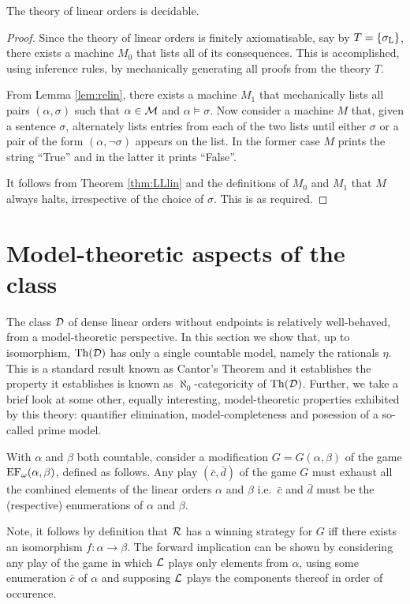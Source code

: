 \begin{thm} The theory of linear orders is decidable.
\end{thm}
\begin{proof} Since the theory of linear orders is finitely axiomatisable, say
	by $T=\left\lbrace \sigma_{\mathrm{L}}\right\rbrace$, there exists a machine $M_0$ that lists all of its
	consequences.  This is accomplished, using inference rules, by mechanically
	generating all proofs from the theory $T$.

	From Lemma \ref{lem:relin}, there exists a machine $M_1$ that mechanically
	lists all pairs $(\alpha,\sigma)$ such that $\alpha\in\mathcal{M}$ and
	$\alpha\models\sigma$.  Now consider a machine $M$ that, given a sentence
	$\sigma$, alternately lists entries from each of the two lists until either
	$\sigma$ or a pair of the form $(\alpha,\neg\sigma)$ appears on the list.  In
	the former case $M$ prints the string ``True'' and in the latter it prints
	``False''.

	It follows from Theorem \ref{thm:LLlin} and the definitions of $M_0$ and
	$M_1$ that $M$ always halts, irrespective of the choice of $\sigma$.  This is as
	required.
\end{proof}


\section{Model-theoretic aspects of the class \text{$\dense$}}

The class $\dense$ of dense linear orders without endpoints is relatively
well-behaved, from a model-theoretic perspective.  In this section we show that,
up to isomorphism, $\operatorname{Th}(\mathcal{D})$ has only a single countable model, namely the
rationals $\eta$.  This is a standard result known as Cantor's Theorem and it
establishes the property it establishes is known as $\aleph_0$-categoricity of
$\operatorname{Th}(\mathcal{D})$.  Further, we take a brief look at some other, equally
interesting, model-theoretic properties exhibited by this theory: quantifier
elimination, model-completeness and posession of a so-called prime model.

With $\alpha$ and $\beta$ both countable, consider a modification
$G=G(\alpha,\beta)$ of the game $\operatorname{EF}_{\omega}(\alpha,\beta)$, defined as
follows.  Any play $(\bar{c},\bar{d})$ of the game $G$ must exhaust all the
combined elements of the linear orders $\alpha$ and $\beta$ i.e.\ $\bar{c}$ and
$\bar{d}$ must be the (respective) enumerations of $\alpha$ and $\beta$.

Note, it follows by definition that $\mathcal{R}$ has a winning strategy for $G$ iff
there exists an isomorphism $f\colon\alpha\to\beta$.  The forward implication
can be shown by considering any play of the game in which $\mathcal{L}$ plays
only elements from $\alpha$, using some enumeration $\bar{c}$ of $\alpha$ and
supposing $\mathcal{L}$ plays the components thereof in order of occurence.


